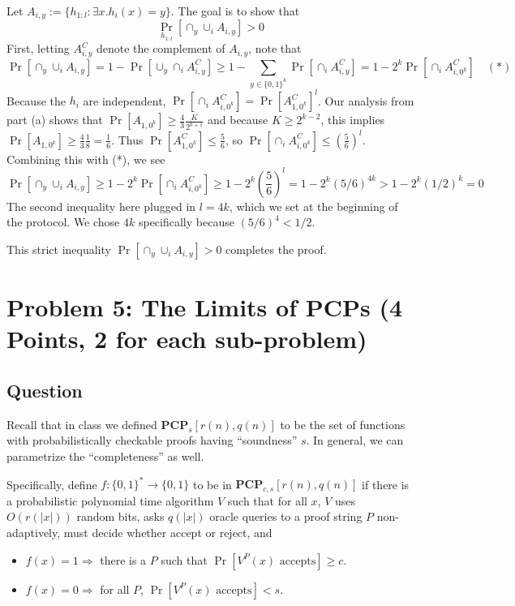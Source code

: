 \documentclass{article}
\newcommand{\mf}[1]{\mathbf{#1}}
\begin{document}
Let $A_{i, y} := \{h_{1:l} : \exists x . h_i(x) = y\}$.
The goal is to show that
$$
\Pr_{h_{1:l}}[\cap_y \cup_i A_{i, y}] > 0
$$
First, letting $A_{i, y}^C$ denote the complement of $A_{i, y}$, note that
$$
\Pr[\cap_y \cup_i A_{i, y}] = 1 - \Pr[\cup_y \cap_i A_{i, y}^C]
\geq 1 - \sum_{y \in \{0, 1\}^k} \Pr[\cap_i A_{i, y}^C] = 1 - 2^k\Pr[\cap_i A_{i, 0^k}^C] \quad (*)
$$
Because the $h_i$ are independent, 
$
\Pr[\cap_i A_{i, 0^k}^C]
= \Pr[A_{1, 0^k}^C]^l
$.
Our analysis from part (a) shows that
$
\Pr[A_{1, 0^k}] \geq \frac{4}{3} \frac{K}{2^{k+1}}
$
and because $K \geq 2^{k-2}$, this implies
$
\Pr[A_{1, 0^k}] \geq \frac{4}{3} \frac{1}{8} = \frac{1}{6}
$.
Thus $\Pr[A_{1, 0^k}^C] \leq \frac{5}{6}$, so 
$
\Pr[\cap_i A_{i, 0^k}^C] \leq (\frac{5}{6})^l
$.
Combining this with (*), we see
$$
\Pr[\cap_y \cup_i A_{i, y}] \geq 1 - 2^k \Pr[\cap_i A_{i, 0^k}^C] \geq 1 - 2^k (\frac{5}{6})^l
= 1 - 2^k (5/6)^{4k} > 1 - 2^k (1/2)^k = 0
$$
The second inequality here plugged in $l = 4k$, which we set at the beginning of the protocol.
We chose $4k$ specifically because $(5/6)^4 < 1/2$.

This strict inequality $\Pr[\cap_y \cup_i A_{i, y}] > 0$ completes the proof.

\newpage
\section*{Problem 5: The Limits of PCPs (4 Points, 2 for each sub-problem)}
\subsection*{Question}
Recall that in class we defined $\mf{PCP}_s[r(n),q(n)]$ to be the set of functions with probabilistically checkable proofs having ``soundness'' $s$. In general, we can parametrize the ``completeness'' as well. 

Specifically, define $f:\{0,1\}^* \rightarrow \{0,1\}$ to be in $\mf{PCP}_{c,s}[r(n),q(n)]$ if there is a probabilistic polynomial time algorithm $V$ such that for all $x$, $V$ uses $O(r(|x|))$ random bits, asks $q(|x|)$ oracle queries to a proof string $P$ non-adaptively, must decide whether accept or reject, and
\begin{itemize}
	\item
	$f(x) = 1 \Longrightarrow$ there is a $P$ such that $\Pr[V^P(x) \textrm{ accepts}] \geq c$.
	\item
	$f(x) = 0 \Longrightarrow$ for all $P$, $\Pr[V^P(x) \textrm{ accepts}] < s$.
\end{itemize}
\end{document}
